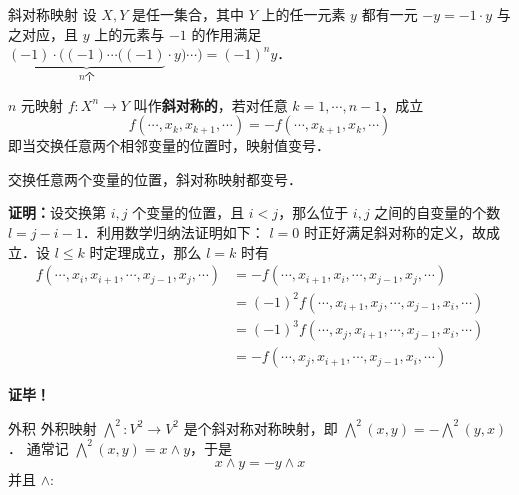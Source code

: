 

\begin{definition}{斜对称映射}
设 $X,Y$ 是任一集合，其中 $Y$ 上的任一元素 $y$ 都有一元 $-y=-1\cdot y$ 与之对应，且 $y$ 上的元素与 $-1$ 的作用满足 $\underbrace{(-1)\cdot((-1)\cdots((-1)}_{n\text{个}}\cdot y)\cdots)=(-1)^n y$．

 $n$ 元映射 $f:X^n\rightarrow Y$ 叫作\textbf{斜对称的}，若对任意 $k=1,\cdots,n-1$，成立
\begin{equation}
f(\cdots,x_k,x_{k+1},\cdots)=-f(\cdots,x_{k+1},x_k,\cdots)
\end{equation}
即当交换任意两个相邻变量的位置时，映射值变号．
\end{definition}
\begin{theorem}{}
交换任意两个变量的位置，斜对称映射都变号．
\end{theorem}
\textbf{证明：}设交换第 $i,j$ 个变量的位置，且 $i<j$，那么位于 $i,j$ 之间的自变量的个数 $l=j-i-1$．利用数学归纳法证明如下： $l=0$ 时正好满足斜对称的定义，故成立．设 $l\leq k$ 时定理成立，那么 $l=k$ 时有
\begin{equation}
\begin{aligned}
f(\cdots,x_i,x_{i+1},\cdots,x_{j-1},x_j,\cdots)&=-f(\cdots,x_{i+1},x_{i},\cdots,x_{j-1},x_j,\cdots)\\
&=(-1)^2 f(\cdots,x_{i+1},x_{j},\cdots,x_{j-1},x_i,\cdots)\\
&=(-1)^3 f(\cdots,x_{j},x_{i+1},\cdots,x_{j-1},x_i,\cdots)\\
&=-f(\cdots,x_{j},x_{i+1},\cdots,x_{j-1},x_i,\cdots)
\end{aligned}
\end{equation}
  
\textbf{证毕！}
\begin{example}{外积}
外积映射 $\bigwedge^2:V^2\rightarrow V^2$ 是个斜对称对称映射，即 $\bigwedge^2(x,y)=-\bigwedge^2(y,x)$． 通常记 $\bigwedge^2(x,y)=x\wedge y$，于是
\begin{equation}
x\wedge y=-y\wedge x
\end{equation}
并且 $\wedge:$
\end{example}